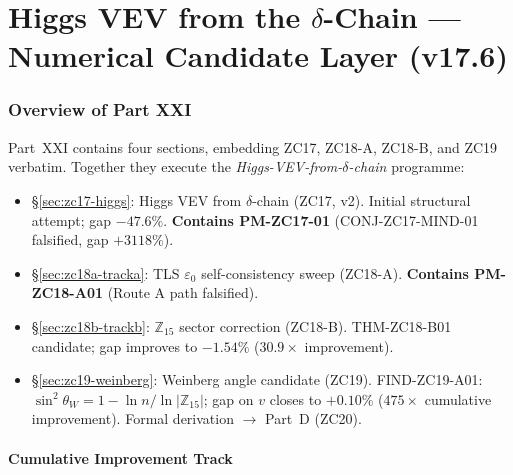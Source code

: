 \documentclass[12pt, a4paper]{article}
\begin{document}
\part{Higgs VEV from the $\delta$-Chain --- Numerical Candidate Layer (v17.6)}
\label{part:XXI}

\section*{Overview of Part XXI}

Part~XXI contains four sections, embedding ZC17, ZC18-A, ZC18-B,
and ZC19 verbatim. Together they execute the
\emph{Higgs-VEV-from-$\delta$-chain} programme:

\begin{itemize}[leftmargin=2em]
\item \S\ref{sec:zc17-higgs}: Higgs VEV from $\delta$-chain (ZC17,
  v2). Initial structural attempt; gap $-47.6\%$. \textbf{Contains
  PM-ZC17-01} (CONJ-ZC17-MIND-01 falsified, gap $+3118\%$).
\item \S\ref{sec:zc18a-tracka}: TLS $\varepsilon_0$ self-consistency
  sweep (ZC18-A). \textbf{Contains PM-ZC18-A01} (Route A path
  falsified).
\item \S\ref{sec:zc18b-trackb}: $\mathbb{Z}_{15}$ sector correction
  (ZC18-B). THM-ZC18-B01 candidate; gap improves to $-1.54\%$
  ($30.9\times$ improvement).
\item \S\ref{sec:zc19-weinberg}: Weinberg angle candidate (ZC19).
  FIND-ZC19-A01: $\sin^2\theta_W = 1 - \ln n/\ln|\mathbb{Z}_{15}|$;
  gap on $v$ closes to $+0.10\%$ ($475\times$ cumulative improvement).
  Formal derivation $\to$ Part~D (ZC20).
\end{itemize}

\subsection*{Cumulative Improvement Track}

\begin{center}
\end{center}
\end{document}
